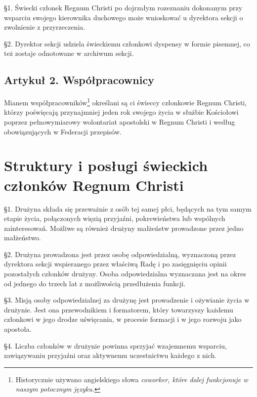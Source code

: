 
 \S{}1. Świecki członek Regnum Christi po dojrzałym rozeznaniu dokonanym przy wsparciu swojego kierownika duchowego może wnioskować u dyrektora sekcji o zwolnienie z przyrzeczenia.

\S{}2. Dyrektor sekcji udziela świeckiemu członkowi dyspensy w formie pisemnej, co też zostaje odnotowane w archiwum sekcji.

\filbreak


\section{Artykuł 2. Współpracownicy}


 Mianem współpracowników\footnote{Historycznie używano angielskiego słowa \em{coworker}, które dalej funkcjonuje w naszym potocznym języku.} określani są ci świeccy członkowie Regnum Christi, którzy poświęcają przynajmniej jeden rok swojego życia w służbie Kościołowi poprzez pełnowymiarowy wolontariat apostolski w Regnum Christi i według obowiązujących w Federacji przepisów.

\chapter{Struktury i posługi świeckich członków Regnum Christi}


 \S{}1. Drużyna składa się przeważnie z osób tej samej płci, będących na tym samym etapie życia, połączonych więzią przyjaźni, pokrewieństwa lub wspólnych zainteresowań. Możliwe są również drużyny małżeństw prowadzone przez jedno małżeństwo.

\S{}2. Drużyna prowadzona jest przez osobę odpowiedzialną, wyznaczoną przez dyrektora sekcji wspieranego przez właściwą Radę i po zasięgnięciu opinii pozostałych członków drużyny. Osoba odpowiedzialna wyznaczana jest na okres od jednego do trzech lat z możliwością przedłużenia funkcji.

\S{}3. Misją osoby odpowiedzialnej za drużynę jest prowadzenie i ożywianie życia w drużynie. Jest ona przewodnikiem i formatorem, który towarzyszy każdemu członkowi w jego drodze uświęcania, w procesie formacji i w jego rozwoju jako apostoła.

\S{}4. Liczba członków w drużynie powinna sprzyjać wzajemnemu wsparciu, zawiązywaniu przyjaźni oraz aktywnemu uczestnictwu każdego z nich.

